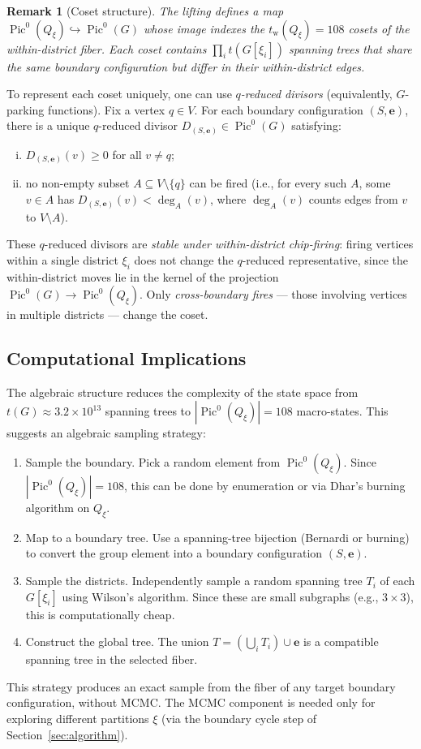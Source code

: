 \documentclass[11pt]{article}
\newtheorem{remark}{Remark}[section]
\newcommand{\Pic}{\operatorname{Pic}^0}
\newcommand{\tw}{t_{\mathrm{w}}}
\begin{document}
\begin{remark}[Coset structure]
The lifting defines a map $\Pic(Q_{\xi}) \hookrightarrow \Pic(G)$ whose image
indexes the $\tw(Q_{\xi}) = 108$ cosets of the within-district fiber. Each coset
contains $\prod_i t(G[\xi_i])$ spanning trees that share the same boundary
configuration but differ in their within-district edges.
\end{remark}

To represent each coset uniquely, one can use \emph{$q$-reduced divisors}
(equivalently, $G$-parking functions). Fix a vertex $q \in V$. For each
boundary configuration $(S, \mathbf{e})$, there is a unique $q$-reduced
divisor $D_{(S,\mathbf{e})} \in \Pic(G)$ satisfying:
\begin{enumerate}[(i)]
  \item $D_{(S,\mathbf{e})}(v) \geq 0$ for all $v \neq q$;
  \item no non-empty subset $A \subseteq V \setminus \{q\}$ can be fired
    (i.e., for every such $A$, some $v \in A$ has
    $D_{(S,\mathbf{e})}(v) < \deg_A(v)$, where $\deg_A(v)$ counts edges from
    $v$ to $V \setminus A$).
\end{enumerate}
These $q$-reduced divisors are \emph{stable under within-district
chip-firing}: firing vertices within a single district $\xi_i$ does not
change the $q$-reduced representative, since the within-district moves lie in
the kernel of the projection $\Pic(G) \to \Pic(Q_{\xi})$. Only
\emph{cross-boundary fires} --- those involving vertices in multiple
districts --- change the coset.

\subsection{Computational Implications}

The algebraic structure reduces the complexity of the state space from
$t(G) \approx 3.2 \times 10^{13}$ spanning trees to $|\Pic(Q_{\xi})| = 108$
macro-states. This suggests an algebraic sampling strategy:
\begin{enumerate}
  \item Sample the boundary. Pick a random element from $\Pic(Q_{\xi})$.
    Since $|\Pic(Q_{\xi})| = 108$, this can be done by enumeration or via
    Dhar's burning algorithm on $Q_{\xi}$.
  \item Map to a boundary tree. Use a spanning-tree bijection
    (Bernardi or burning) to convert the group element into a boundary
    configuration $(S, \mathbf{e})$.
  \item Sample the districts. Independently sample a random spanning
    tree $T_i$ of each $G[\xi_i]$ using Wilson's algorithm. Since these are
    small subgraphs (e.g., $3 \times 3$), this is computationally cheap.
  \item Construct the global tree. The union
    $T = (\bigcup_i T_i) \cup \mathbf{e}$ is a compatible spanning tree in the
    selected fiber.
\end{enumerate}
This strategy produces an exact sample from the fiber of any target boundary
configuration, without MCMC. The MCMC component is needed only for exploring
different partitions $\xi$ (via the boundary cycle step of
Section~\ref{sec:algorithm}).
\end{document}
